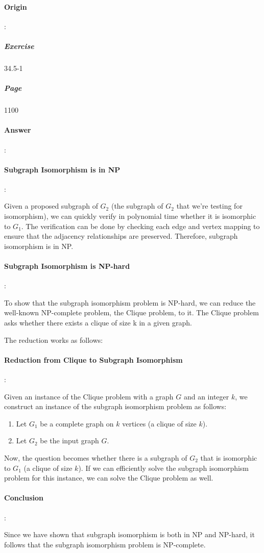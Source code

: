 \documentclass{article}
\begin{document}
\paragraph{Origin}:
  \subparagraph{Exercise}34.5-1
  \subparagraph{Page}1100
\paragraph{Answer}:



\paragraph{Subgraph Isomorphism is in NP}:

Given a proposed subgraph of $G_2$ (the subgraph of $G_2$ that we're testing for isomorphism), we can quickly verify in polynomial time whether it is isomorphic to $G_1$. The verification can be done by checking each edge and vertex mapping to ensure that the adjacency relationships are preserved. Therefore, subgraph isomorphism is in NP.

\paragraph{Subgraph Isomorphism is NP-hard}:

To show that the subgraph isomorphism problem is NP-hard, we can reduce the well-known NP-complete problem, the Clique problem, to it. The Clique problem asks whether there exists a clique of size k in a given graph.

The reduction works as follows:

\paragraph{Reduction from Clique to Subgraph Isomorphism}:

Given an instance of the Clique problem with a graph $G$ and an integer $k$, we construct an instance of the subgraph isomorphism problem as follows:

\begin{enumerate}
  \item Let $G_1$ be a complete graph on $k$ vertices (a clique of size $k$).
  \item Let $G_2$ be the input graph $G$.
\end{enumerate}

Now, the question becomes whether there is a subgraph of $G_2$ that is isomorphic to $G_1$ (a clique of size $k$). If we can efficiently solve the subgraph isomorphism problem for this instance, we can solve the Clique problem as well.

\paragraph{Conclusion}:

Since we have shown that subgraph isomorphism is both in NP and NP-hard, it follows that the subgraph isomorphism problem is NP-complete.
\end{document}
